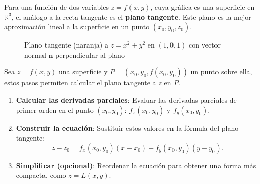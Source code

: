 Para una función de dos variables $z=f(x,y)$, cuya gráfica es una superficie en $\mathbb{R}^3$, el análogo a la recta tangente es el \textbf{plano tangente}. Este plano es la mejor aproximación lineal a la superficie en un punto $(x_0, y_0, z_0)$.

\begin{figure}[!htbp]
\centering
{}
\caption{Plano tangente (naranja) a $z=x^2+y^2$ en $(1,0,1)$
         con vector normal $\mathbf{n}$ perpendicular al plano}
\label{fig:plano_tangente_3d}
\end{figure}

\begin{pasos}\label{pasos:plano_tangente} Sea $z=f(x,y)$ una superficie y $P=(x_0, y_0, f(x_0, y_0))$ un punto sobre ella, estos pasos permiten calcular el plano tangente a $z$ en $P.$
\begin{enumerate}
    \item \textbf{Calcular las derivadas parciales}: Evaluar las derivadas parciales de primer orden en el punto $(x_0, y_0)$: $f_x(x_0, y_0)$ y $f_y(x_0, y_0)$.
    \item \textbf{Construir la ecuación}: Sustituir estos valores en la fórmula del plano tangente:
    \[
    z - z_0 = f_x(x_0, y_0)(x - x_0) + f_y(x_0, y_0)(y - y_0).
    \]
    \item \textbf{Simplificar (opcional)}: Reordenar la ecuación para obtener una forma más compacta, como $z = L(x, y)$.
\end{enumerate}
\end{pasos}

